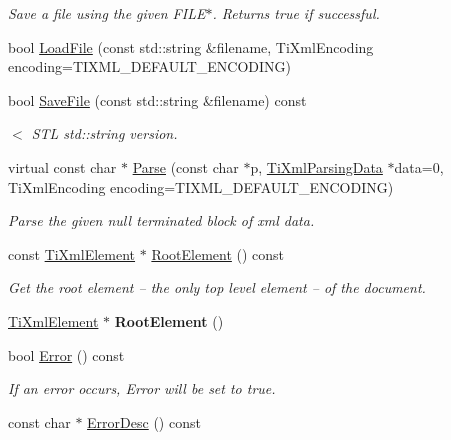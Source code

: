 \begin{DoxyCompactItemize}
\begin{DoxyCompactList}\small\item\em Save a file using the given F\+I\+L\+E$\ast$. Returns true if successful. \end{DoxyCompactList}\item 
bool \hyperlink{class_ti_xml_document_a18ae6ed34fed7991ebc220862dfac884}{Load\+File} (const std\+::string \&filename, Ti\+Xml\+Encoding encoding=T\+I\+X\+M\+L\+\_\+\+D\+E\+F\+A\+U\+L\+T\+\_\+\+E\+N\+C\+O\+D\+I\+NG)
\item 
bool \hyperlink{class_ti_xml_document_a3d4fae0463f3f03679ba0b7cf6f2df52}{Save\+File} (const std\+::string \&filename) const \hypertarget{class_ti_xml_document_a3d4fae0463f3f03679ba0b7cf6f2df52}{}\label{class_ti_xml_document_a3d4fae0463f3f03679ba0b7cf6f2df52}

\begin{DoxyCompactList}\small\item\em $<$ S\+TL std\+::string version. \end{DoxyCompactList}\item 
virtual const char $\ast$ \hyperlink{class_ti_xml_document_a789ad2f06f93d52bdb5570b2f3670289}{Parse} (const char $\ast$p, \hyperlink{class_ti_xml_parsing_data}{Ti\+Xml\+Parsing\+Data} $\ast$data=0, Ti\+Xml\+Encoding encoding=T\+I\+X\+M\+L\+\_\+\+D\+E\+F\+A\+U\+L\+T\+\_\+\+E\+N\+C\+O\+D\+I\+NG)
\begin{DoxyCompactList}\small\item\em Parse the given null terminated block of xml data. \end{DoxyCompactList}\item 
const \hyperlink{class_ti_xml_element}{Ti\+Xml\+Element} $\ast$ \hyperlink{class_ti_xml_document_ad09d17927f908f40efb406af2fb873be}{Root\+Element} () const 
\begin{DoxyCompactList}\small\item\em Get the root element -- the only top level element -- of the document. \end{DoxyCompactList}\item 
\hyperlink{class_ti_xml_element}{Ti\+Xml\+Element} $\ast$ {\bfseries Root\+Element} ()\hypertarget{class_ti_xml_document_a0b43e762a23f938b06651bc90b8a1013}{}\label{class_ti_xml_document_a0b43e762a23f938b06651bc90b8a1013}

\item 
bool \hyperlink{class_ti_xml_document_a6dfc01a6e5d58e56acd537dfd3bdeb29}{Error} () const 
\begin{DoxyCompactList}\small\item\em If an error occurs, Error will be set to true. \end{DoxyCompactList}\item 
const char $\ast$ \hyperlink{class_ti_xml_document_a9d0f689f6e09ea494ea547be8d79c25e}{Error\+Desc} () const \hypertarget{class_ti_xml_document_a9d0f689f6e09ea494ea547be8d79c25e}{}\label{class_ti_xml_document_a9d0f689f6e09ea494ea547be8d79c25e}


\end{DoxyCompactItemize}
